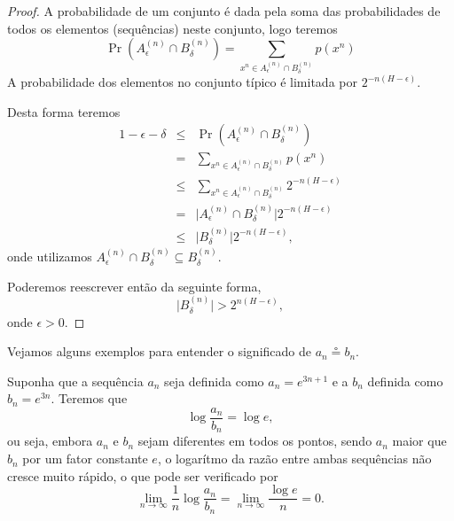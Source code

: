 \begin{frame}[allowframebreaks]
\begin{proof}
  \proofbreak

  A probabilidade de um conjunto é dada pela soma das probabilidades de todos os elementos (sequências) neste conjunto, logo teremos
  \begin{equation}
  \Pr(A_{\epsilon}^{(n)} \cap B_{\delta}^{(n)}) = \sum_{x^n \in A_{\epsilon}^{(n)} \cap B_{\delta}^{(n)}} p(x^n)
  \end{equation}
  A probabilidade dos elementos no conjunto típico é limitada por $2^{-n(H-\epsilon)}$. 

  \proofbreak
  Desta forma teremos
  \begin{eqnarray}
  1 - \epsilon - \delta &\leq& \Pr(A_{\epsilon}^{(n)} \cap B_{\delta}^{(n)}) \nonumber \\
                &=& \sum_{x^n \in A_{\epsilon}^{(n)} \cap B_{\delta}^{(n)}} p(x^n) \nonumber \\
                &\leq& \sum_{x^n \in A_{\epsilon}^{(n)} \cap B_{\delta}^{(n)}} 2^{-n(H-\epsilon)} \nonumber \\
                &=& \vert A_{\epsilon}^{(n)} \cap B_{\delta}^{(n)} \vert 2^{-n(H-\epsilon)} \nonumber \\
                &\leq& \vert B_{\delta}^{(n)} \vert 2^{-n(H-\epsilon)},
  \end{eqnarray} 
  onde utilizamos $A_{\epsilon}^{(n)} \cap B_{\delta}^{(n)} \subseteq B_{\delta}^{(n)}$.

  \proofbreak
  Poderemos reescrever então da seguinte forma,
  \begin{equation}
  \vert B_{\delta}^{(n)} \vert  >  2^{n(H-\epsilon)} ,
  \end{equation}
  onde $\epsilon > 0$.

  \end{proof}

  \framebreak

  Vejamos alguns exemplos para entender o significado de $a_n \circeq b_n$.
  \begin{example}
  Suponha que a sequência $a_n$ seja definida como $a_n = e^{3n+1}$ e a $b_n$ definida como $b_n = e^{3n}$.
  Teremos que
  \begin{equation}
   \log \frac{a_n}{b_n} = \log e ,
  \end{equation}
  ou seja, embora $a_n$ e $b_n$ sejam diferentes em todos os pontos, sendo $a_n$ maior que $b_n$ por 
  um fator constante $e$, o logarítmo da razão entre ambas sequências não cresce muito rápido, o que pode ser
  verificado por
  \begin{equation}
   \lim_{n \rightarrow \infty} \frac{1}{n} \log \frac{a_n}{b_n} = \lim_{n \rightarrow \infty} \frac{\log e}{n} = 0 .
  \end{equation}
  \end{example}


\end{frame}
